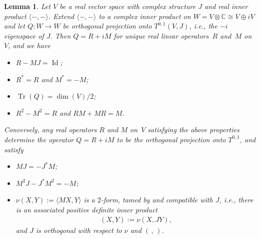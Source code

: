 \documentclass[10pt,a4paper]{amsart}
\DeclareMathOperator{\Tr}{Tr}
\newtheorem{lem}[thm]{Lemma}
\numberwithin{equation}{section}
\newcommand{\CC}{\mathbb{C}}
\begin{document}
\begin{lem} \label{lem;JRM} Let $V$ be a real vector space with complex structure $J$ and real inner product $\langle - ,- \rangle$. Extend $\langle - ,- \rangle$ to a complex inner product on $W = V \otimes \CC \cong V \oplus i V$ and let $Q\colon W \to W$ be orthogonal projection onto $T^{0,1}(V,J)$, i.e., the $-i$ eigenspace of $J$. Then $Q = R + i M$ for unique real linear operators~$R$ and~$M$ on~$V$, and we have
\begin{itemize}\itemsep=0pt
\item[$(1)$] $R-MJ= \operatorname{Id}$;
\item[$(2)$] $R^* = R$ and $M^* = -M$;
\item[$(3)$] $\Tr(Q) = \dim(V)/2$;
\item[$(4)$] $R^2-M^2 = R$ and $RM+MR= M$.
\end{itemize}
Conversely, any real operators $R$ and $M$ on~$V$ satisfying the above properties determine the operator $Q=R+iM$ to be the orthogonal projection onto $T^{0,1}$, and satisfy
\begin{itemize}\itemsep=0pt
\item[$(a)$] $MJ= - J^*M$;
\item[$(b)$] $ M^2J-J^*M^2 = -M$;
\item[$(c)$] $\nu(X,Y) := \langle M X,Y\rangle$ is a $2$-form, tamed by and compatible with $J$, i.e., there is an associated positive definite inner product
\begin{gather*}
(X,Y) := \nu(X,JY),
\end{gather*}
and $J$ is orthogonal with respect to $\nu$ and $( \, , \, )$.
\end{itemize}
\end{lem}
\end{document}
